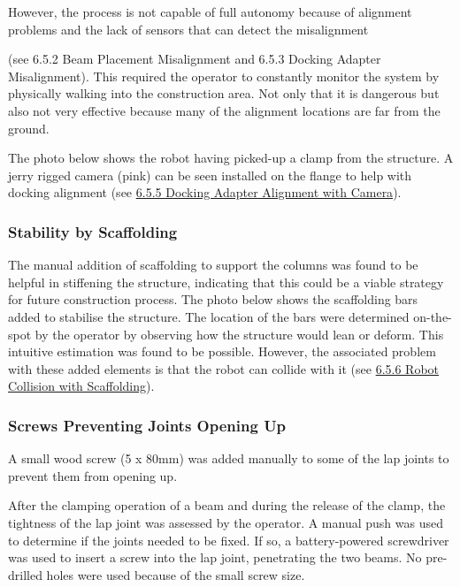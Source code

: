However, the process is not capable of full autonomy because of alignment problems and the lack of sensors that can detect the misalignment {(see 6.5.2 Beam Placement Misalignment and 6.5.3 Docking Adapter Misalignment). This required the operator to constantly monitor the system by physically walking into the construction area. Not only that it is dangerous but also not very effective because many of the alignment locations are far from the ground. 

The photo below shows the robot having picked-up a clamp from the structure. A jerry rigged camera (pink) can be seen installed on the flange to help with docking alignment (see \ul{6.5.5 Docking Adapter Alignment with Camera}). 




\subsubsection{Stability by Scaffolding}
\label{subsubsection:exploration_3_stability_by_scaffolding}

The manual addition of scaffolding to support the columns was found to be helpful in stiffening the structure, indicating that this could be a viable strategy for future construction process. The photo below shows the scaffolding bars added to stabilise the structure. The location of the bars were determined on-the-spot by the operator by observing how the structure would lean or deform. This intuitive estimation was found to be possible. However, the associated problem with these added elements is that the robot can collide with it (see \ul{6.5.6 Robot Collision with Scaffolding}).




\subsubsection{Screws Preventing Joints Opening Up}
\label{subsubsection:exploration_3_screws_preventing_joints_opening_up}

A small wood screw (5 x 80mm) was added manually to some of the lap joints to prevent them from opening up. 

After the clamping operation of a beam and during the release of the clamp, the tightness of the lap joint was assessed by the operator. A manual push was used to determine if the joints needed to be fixed. If so, a battery-powered screwdriver was used to insert a screw into the lap joint, penetrating the two beams. No pre-drilled holes were used because of the small screw size. 

}
